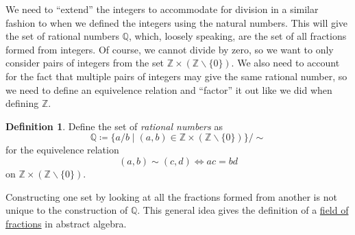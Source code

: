 \documentclass{article}
\newcommand{\Q}{\mathbb{Q}}
\newcommand{\Z}{\mathbb{Z}}
\theoremstyle{definition}
\newtheorem{definition}{Definition}[section]
\begin{document}
	We need to ``extend'' the integers to accommodate for division in a similar fashion to when we defined the integers using the natural numbers. This will give the set of rational numbers $\Q$, which, loosely speaking, are the set of all fractions formed from integers. Of course, we cannot divide by zero, so we want to only consider pairs of integers from the set $\Z\times(\Z\backslash\{0\})$. We also need to account for the fact that multiple pairs of integers may give the same rational number, so we need to define an equivelence relation and ``factor'' it out like we did when defining $\Z$. 
	
	
	\begin{definition}\label{def1.3}
		Define the set of \textit{\color{red}rational numbers} as $$ \Q\coloneqq\{a/b\mid(a,b)\in\Z\times(\Z\backslash\{0\}) \}/\sim $$ for the equivelence relation 
		$$ (a,b) \sim (c,d) \iff ac = bd$$ on $\Z\times(\Z\backslash\{0\})$. 
	\end{definition}

	Constructing one set by looking at all the fractions formed from another is not unique to the construction of $\Q$. This general idea gives the definition of a  \href{https://mathweb.ucsd.edu/~jmckerna/Teaching/15-16/Spring/103B/l_14.pdf}{field of fractions} in abstract algebra.
\end{document}

